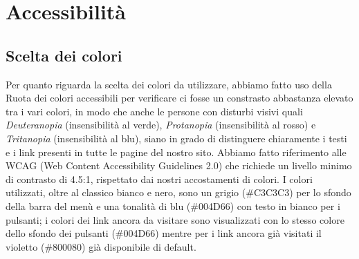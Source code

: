 \section{Accessibilità}

\subsection{Scelta dei colori}
Per quanto riguarda la scelta dei colori da utilizzare, abbiamo fatto uso della Ruota dei colori accessibili per verificare ci fosse un constrasto abbastanza elevato tra i vari colori, in modo che anche le persone con disturbi visivi quali \emph{Deuteranopia} (insensibilità al verde), \emph{Protanopia} (insensibilità al rosso) e \emph{Tritanopia} (insensibilità al blu), siano in grado di distinguere chiaramente i testi e i link presenti in tutte le pagine del nostro sito.\newline
Abbiamo fatto riferimento alle WCAG (Web Content Accessibility Guidelines 2.0) che richiede un livello minimo di contrasto di 4.5:1, rispettato dai nostri accostamenti di colori.\newline
I colori utilizzati, oltre al classico bianco e nero, sono un grigio (\#C3C3C3) per lo sfondo della barra del menù e una tonalità di blu (\#004D66) con testo in bianco per i pulsanti; i colori dei link ancora da visitare sono visualizzati con lo stesso colore dello sfondo dei pulsanti (\#004D66) mentre per i link ancora già visitati il violetto (\#800080) già disponibile di default.